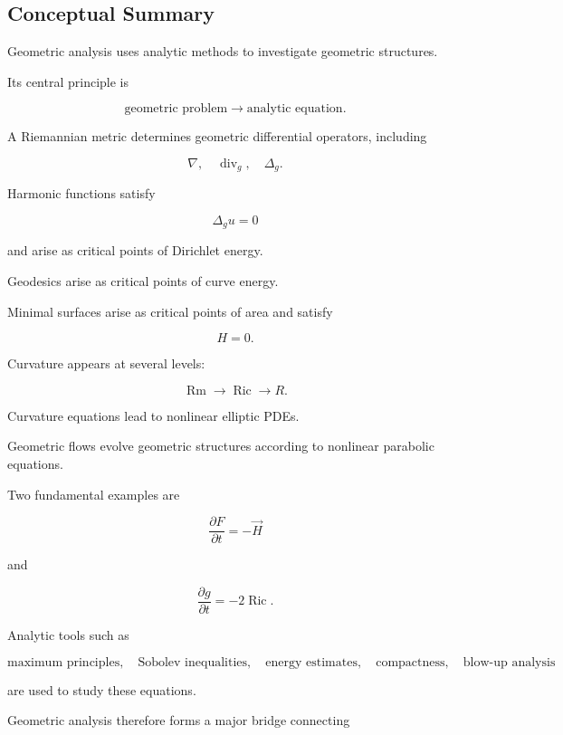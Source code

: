 \subsection{Conceptual Summary}
\label{subsec:geometric-analysis-summary}

Geometric analysis uses analytic methods to investigate geometric
structures.

Its central principle is

\[
\boxed{
\text{geometric problem}
\longrightarrow
\text{analytic equation}.
}
\]

A Riemannian metric determines geometric differential operators,
including

\[
\boxed{
\nabla,
\quad
\operatorname{div}_g,
\quad
\Delta_g.
}
\]

Harmonic functions satisfy

\[
\boxed{
\Delta_g u=0
}
\]

and arise as critical points of Dirichlet energy.

Geodesics arise as critical points of curve energy.

Minimal surfaces arise as critical points of area and satisfy

\[
\boxed{
H=0.
}
\]

Curvature appears at several levels:

\[
\boxed{
\operatorname{Rm}
\longrightarrow
\operatorname{Ric}
\longrightarrow
R.
}
\]

Curvature equations lead to nonlinear elliptic PDEs.

Geometric flows evolve geometric structures according to nonlinear
parabolic equations.

Two fundamental examples are

\[
\boxed{
\frac{\partial F}{\partial t}
=
-\vec H
}
\]

and

\[
\boxed{
\frac{\partial g}{\partial t}
=
-2\operatorname{Ric}.
}
\]

Analytic tools such as

\[
\boxed{
\text{maximum principles},
\quad
\text{Sobolev inequalities},
\quad
\text{energy estimates},
\quad
\text{compactness},
\quad
\text{blow-up analysis}
}
\]

are used to study these equations.

Geometric analysis therefore forms a major bridge connecting

